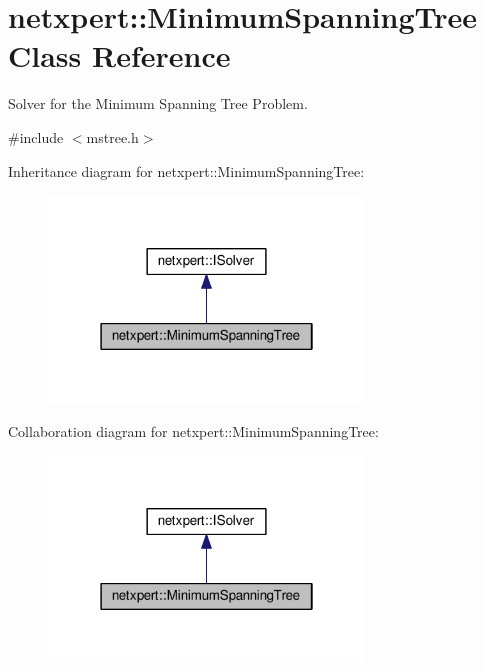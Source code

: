 \hypertarget{classnetxpert_1_1MinimumSpanningTree}{}\section{netxpert\+:\+:Minimum\+Spanning\+Tree Class Reference}
\label{classnetxpert_1_1MinimumSpanningTree}


Solver for the Minimum Spanning Tree Problem.  




{\ttfamily \#include $<$mstree.\+h$>$}



Inheritance diagram for netxpert\+:\+:Minimum\+Spanning\+Tree\+:\nopagebreak
\begin{figure}[H]
\begin{center}
\leavevmode
\includegraphics[width=238pt]{classnetxpert_1_1MinimumSpanningTree__inherit__graph}
\end{center}
\end{figure}


Collaboration diagram for netxpert\+:\+:Minimum\+Spanning\+Tree\+:\nopagebreak
\begin{figure}[H]
\begin{center}
\leavevmode
\includegraphics[width=238pt]{classnetxpert_1_1MinimumSpanningTree__coll__graph}
\end{center}
\end{figure}
